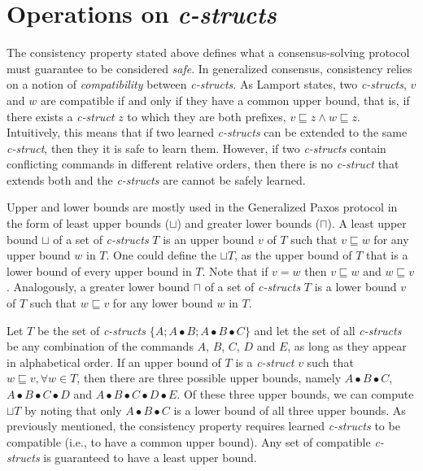 \section{Operations on \textit{c-structs}} \label{Operations}
The consistency property stated above defines what a consensus-solving protocol must guarantee to be considered \textit{safe}. In generalized consensus, consistency relies on a notion of \textit{compatibility} between \textit{c-structs}. As Lamport states, two \textit{c-structs}, $v$ and $w$ are compatible if and only if they have a common upper bound, that is, if there exists a \textit{c-struct} $z$ to which they are both prefixes, $v \sqsubseteq z \land w \sqsubseteq z$. Intuitively, this means that if two learned \textit{c-structs} can be extended to the same \textit{c-struct}, then they it is safe to learn them. However, if two \textit{c-structs} contain conflicting commands in different relative orders, then there is no \textit{c-struct} that extends both and the \textit{c-structs} are cannot be safely learned.\par
Upper and lower bounds are mostly used in the Generalized Paxos protocol in the form of least upper bounds ($\sqcup$) and greater lower bounds ($\sqcap$). A least upper bound $\sqcup$ of a set of \textit{c-structs} $T$  is an upper bound $v$ of $T$ such that $v \sqsubseteq w$ for any upper bound $w$ in $T$. One could define the $\sqcup T$, as the upper bound of $T$ that is a lower bound of every upper bound in $T$. Note that if $v = w$ then $v\sqsubseteq w$ and $w\sqsubseteq v$. Analogously, a greater lower bound $\sqcap$ of a set of \textit{c-structs} $T$ is a lower bound $v$ of $T$ such that $w \sqsubseteq v$ for any lower bound $w$ in $T$. \par
Let $T$ be the set of \textit{c-structs} $\{A ; A \bullet B ; A \bullet B \bullet C\}$ and let the set of all \textit{c-structs} be any combination of the commands $A$, $B$, $C$, $D$ and $E$, as long as they appear in alphabetical order. If an upper bound of $T$ is a \textit{c-struct} $v$ such that $w \sqsubseteq v, \forall w \in T$, then there are three possible upper bounds, namely $A \bullet B \bullet C$, $A \bullet B \bullet C \bullet D$ and $A \bullet B \bullet C \bullet D \bullet E$. Of these three upper bounds, we can compute $\sqcup T$ by noting that only $A \bullet B \bullet C$ is a lower bound of all three upper bounds. As previously mentioned, the consistency property requires learned \textit{c-structs} to be compatible (i.e., to have a common upper bound). Any set of compatible \textit{c-structs} is guaranteed to have a least upper bound. \par 
